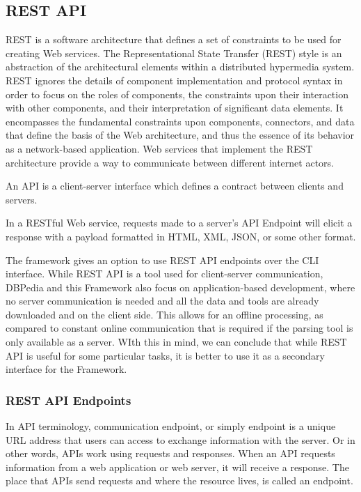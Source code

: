 \documentclass[thesis=M,english,hidelinks]{FITthesis}[2019/12/23]
\begin{document}
\subsection{REST API}

\gls{REST} is a software architecture that defines a set of constraints to be used for creating Web services. The Representational State Transfer (REST) style is an abstraction of the architectural elements within a distributed hypermedia system. REST ignores the details of component implementation and protocol syntax in order to focus on the roles of components, the constraints upon their interaction with other components, and their interpretation of significant data elements. It encompasses the fundamental constraints upon components, connectors, and data that define the basis of the Web architecture, and thus the essence of its behavior as a network-based application\cite{rest_proposal}. Web services that implement the REST architecture provide a way to communicate between different internet actors.

An \gls{API} is a client-server interface which defines a contract between clients and servers.

In a RESTful Web service, requests made to a server's API Endpoint will elicit a response with a payload formatted in HTML, XML, JSON, or some other format.

The framework gives an option to use REST API endpoints over the CLI interface. While REST API is a tool used for client-server communication, DBPedia and this Framework also focus on application-based development, where no server communication is needed and all the data and tools are already downloaded and on the client side. This allows for an offline processing, as compared to constant online communication that is required if the parsing tool is only available as a server. WIth this in mind, we can conclude that while \gls{REST} \gls{API} is useful for some particular tasks, it is better to use it as a secondary interface for the Framework.

\subsubsection{REST API Endpoints}

In \gls{API} terminology, communication endpoint, or simply endpoint is a unique URL address that users can access to exchange information with the server. Or in other words, APIs work using requests and responses. When an API requests information from a web application or web server, it will receive a response. The place that APIs send requests and where the resource lives, is called an endpoint. 
\end{document}
